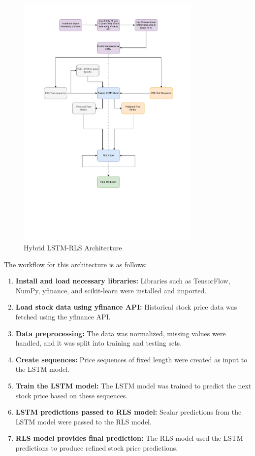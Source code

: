 \begin{figure}[h!]
    \centering
    \includegraphics[width=0.8\textwidth]{Images/SummerInternArchitecture.pdf} %
    \caption{Hybrid LSTM-RLS Architecture}
    \label{fig:summerarch}
\end{figure}

The workflow for this architecture is as follows:
\begin{enumerate}
    \item \textbf{Install and load necessary libraries:} Libraries such as TensorFlow, NumPy, yfinance, and scikit-learn were installed and imported.
    \item \textbf{Load stock data using yfinance API:} Historical stock price data was fetched using the yfinance API.
    \item \textbf{Data preprocessing:} The data was normalized, missing values were handled, and it was split into training and testing sets.
    \item \textbf{Create sequences:} Price sequences of fixed length were created as input to the LSTM model.
    \item \textbf{Train the LSTM model:} The LSTM model was trained to predict the next stock price based on these sequences.
    \item \textbf{LSTM predictions passed to RLS model:} Scalar predictions from the LSTM model were passed to the RLS model.
    \item \textbf{RLS model provides final prediction:} The RLS model used the LSTM predictions to produce refined stock price predictions.
\end{enumerate}

